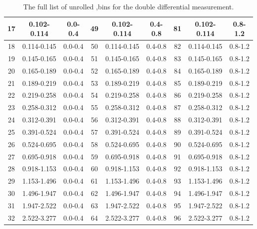 \begin{table}[]
\begin{center}
\begin{tabular}{|c|c|c|c|c|c|c|c|c|}
 17 & 0.102-0.114 & 0.0-0.4 & 49 & 0.102-0.114 & 0.4-0.8 & 81 & 0.102-0.114 & 0.8-1.2 \\ \hline
 18 & 0.114-0.145 & 0.0-0.4 & 50 & 0.114-0.145 & 0.4-0.8 & 82 & 0.114-0.145 & 0.8-1.2 \\ \hline
 19 & 0.145-0.165 & 0.0-0.4 & 51 & 0.145-0.165 & 0.4-0.8 & 83 & 0.145-0.165 & 0.8-1.2 \\ \hline
 20 & 0.165-0.189 & 0.0-0.4 & 52 & 0.165-0.189 & 0.4-0.8 & 84 & 0.165-0.189 & 0.8-1.2 \\ \hline
 21 & 0.189-0.219 & 0.0-0.4 & 53 & 0.189-0.219 & 0.4-0.8 & 85 & 0.189-0.219 & 0.8-1.2 \\ \hline
 22 & 0.219-0.258 & 0.0-0.4 & 54 & 0.219-0.258 & 0.4-0.8 & 86 & 0.219-0.258 & 0.8-1.2 \\ \hline
 23 & 0.258-0.312 & 0.0-0.4 & 55 & 0.258-0.312 & 0.4-0.8 & 87 & 0.258-0.312 & 0.8-1.2 \\ \hline
 24 & 0.312-0.391 & 0.0-0.4 & 56 & 0.312-0.391 & 0.4-0.8 & 88 & 0.312-0.391 & 0.8-1.2 \\ \hline
 25 & 0.391-0.524 & 0.0-0.4 & 57 & 0.391-0.524 & 0.4-0.8 & 89 & 0.391-0.524 & 0.8-1.2 \\ \hline
 26 & 0.524-0.695 & 0.0-0.4 & 58 & 0.524-0.695 & 0.4-0.8 & 90 & 0.524-0.695 & 0.8-1.2 \\ \hline
 27 & 0.695-0.918 & 0.0-0.4 & 59 & 0.695-0.918 & 0.4-0.8 & 91 & 0.695-0.918 & 0.8-1.2 \\ \hline
 28 & 0.918-1.153 & 0.0-0.4 & 60 & 0.918-1.153 & 0.4-0.8 & 92 & 0.918-1.153 & 0.8-1.2 \\ \hline
 29 & 1.153-1.496 & 0.0-0.4 & 61 & 1.153-1.496 & 0.4-0.8 & 93 & 1.153-1.496 & 0.8-1.2 \\ \hline
 30 & 1.496-1.947 & 0.0-0.4 & 62 & 1.496-1.947 & 0.4-0.8 & 94 & 1.496-1.947 & 0.8-1.2 \\ \hline
 31 & 1.947-2.522 & 0.0-0.4 & 63 & 1.947-2.522 & 0.4-0.8 & 95 & 1.947-2.522 & 0.8-1.2 \\ \hline
 32 & 2.522-3.277 & 0.0-0.4 & 64 & 2.522-3.277 & 0.4-0.8 & 96 & 2.522-3.277 & 0.8-1.2 \\ \hline



\end{tabular}

\end{center}
\caption[Half of the 2D bins ]{ The full list of unrolled \phistar,\rapidity bins for the double differential measurement. }
\label{table:phistarAndEtaBins1}
\end{table}


